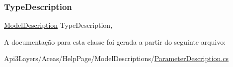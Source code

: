 \subsubsection{\texorpdfstring{Type\+Description}{TypeDescription}}
{\footnotesize\ttfamily \hyperlink{classApi3Layers_1_1Areas_1_1HelpPage_1_1ModelDescriptions_1_1ModelDescription}{Model\+Description} Type\+Description\hspace{0.3cm}{\ttfamily [get]}, {\ttfamily [set]}}



A documentação para esta classe foi gerada a partir do seguinte arquivo\+:\begin{DoxyCompactItemize}
\item 
Api3\+Layers/\+Areas/\+Help\+Page/\+Model\+Descriptions/\hyperlink{ParameterDescription_8cs}{Parameter\+Description.\+cs}\end{DoxyCompactItemize}
